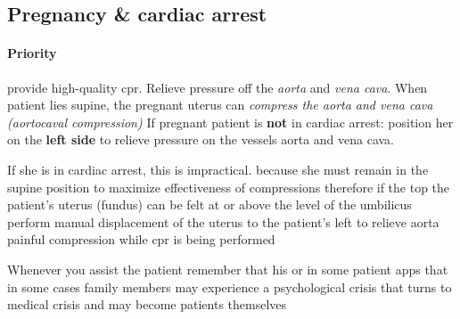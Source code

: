 \documentclass[../../EMT-169.tex]{subfiles}
\begin{document}
\subsection{Pregnancy \& cardiac arrest}
\paragraph{Priority} provide high-quality \acrshort{cpr}.  Relieve pressure off the \emph{aorta} and \emph{vena cava}.
When patient lies supine, the pregnant uterus can \emph{compress the aorta and vena cava (aortocaval compression)} \newline 
If pregnant patient is \textbf{not} in cardiac arrest: position her on the \textbf{left side} to relieve pressure on the vessels aorta and vena cava. \newline

If she is in cardiac arrest, this is impractical.
because she must remain in the supine position to maximize effectiveness of compressions therefore if the top the patient's uterus (fundus) 
can be felt at or above the level of the umbilicus  perform manual displacement of the uterus to the patient's left to relieve aorta painful compression while \acrshort{cpr} is being performed 

Whenever you assist the patient remember that his or in some patient apps that in some cases family members may experience a psychological crisis that turns to medical crisis and may become patients themselves 
\end{document}

